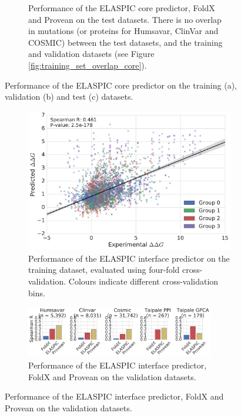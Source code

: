 \begin{figure}[tb]
\begin{subfigure}[b]{1.0\textwidth}
		\caption{
			Performance of the ELASPIC core predictor, FoldX and Provean on the test datasets.
			There is no overlap in mutations (or proteins for Humsavar, ClinVar and COSMIC) between the test datasets,
			and the training and validation datasets (see Figure \ref{fig:training_set_overlap_core}).
		}
		\label{fig:test_performance_core}
		\vspace*{5mm}
	\end{subfigure}
	\caption[Core predictor validation.]{Performance of the ELASPIC core predictor on the training (a), validation (b) and test (c) datasets.}
	\label{fig:core_validation}
\end{figure}

\clearpage

\begin{figure}[tb]
	\centering
	\begin{subfigure}[b]{1.0\textwidth}
		\centering
		\includegraphics[width=0.6\linewidth]{static/elaspic_training_set/validation/crossvalidation_performance_interface.pdf}
		\caption{
			Performance of the ELASPIC interface predictor on the training dataset, evaluated using four-fold cross-validation.
			Colours indicate different cross-validation bins.
		}
		\label{fig:crossvalidation_performance_interface}
		\vspace*{10mm}
	\end{subfigure}
	\begin{subfigure}[b]{1.0\textwidth}
		\centering
		\includegraphics[width=0.9\textwidth]{static/elaspic_training_set/validation/validation_performance_interface.pdf}
		\caption{
			Performance of the ELASPIC interface predictor, FoldX and Provean on the validation datasets.
}
\end{subfigure}
\end{figure}
